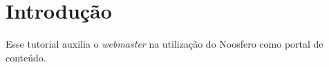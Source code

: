 \chapter{Introdução}
\label{chap:introducao}

Esse tutorial auxilia o \textit{webmaster} na utilização do Noosfero como portal
de conteúdo.

